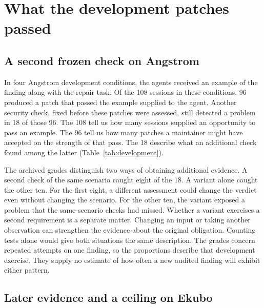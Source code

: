 \section{What the development patches passed}

\label{sec:development}

\subsection{A second frozen check on Angstrom}

In four Angstrom development conditions, the agents received an example of the finding along with the repair task. Of the 108 sessions in these conditions, 96 produced a patch that passed the example supplied to the agent. Another security check, fixed before these patches were assessed, still detected a problem in 18 of those 96. The 108 tell us how many sessions supplied an opportunity to pass an example. The 96 tell us how many patches a maintainer might have accepted on the strength of that pass. The 18 describe what an additional check found among the latter (Table~\ref{tab:development}).

\begin{table}[tbp]
\centering
\caption{Development repairs and their entry conditions. Each row concerns one finding under the stated assessment.}
\label{tab:development}
\small

\end{table}

The archived grades distinguish two ways of obtaining additional evidence. A second check of the same scenario caught eight of the 18. A variant alone caught the other ten. For the first eight, a different assessment could change the verdict even without changing the scenario. For the other ten, the variant exposed a problem that the same-scenario checks had missed. Whether a variant exercises a second requirement is a separate matter. Changing an input or taking another observation can strengthen the evidence about the original obligation. Counting tests alone would give both situations the same description. The grades concern repeated attempts on one finding, so the proportions describe that development exercise. They supply no estimate of how often a new audited finding will exhibit either pattern.

\subsection{Later evidence and a ceiling on Ekubo}

